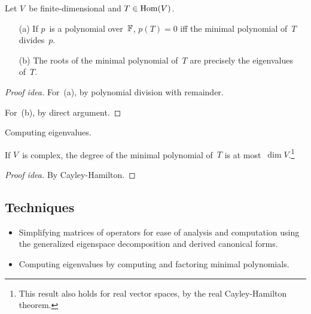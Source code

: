 \begin{thm}
Let \(V\)~be finite-dimensional and \(T\in\operatorname{Hom}(V)\).
\begin{enumerate}[itemsep=0pt]
\item[(a)] If \(p\)~is a polynomial over~\(\mathbb{F}\), \(p(T)=0\) iff the minimal polynomial of~\(T\) divides~\(p\).
\item[(b)] The roots of the minimal polynomial of~\(T\) are precisely the eigenvalues of~\(T\).
\end{enumerate}
\end{thm}
\begin{proof}[Proof idea]
For~(a), by polynomial division with remainder.

For~(b), by direct argument.
\end{proof}
\begin{app}
Computing eigenvalues.
\end{app}
\begin{cor}
If \(V\)~is complex, the degree of the minimal polynomial of~\(T\) is at most~\(\dim V\).\footnote{This result also holds for real vector spaces, by the real Cayley-Hamilton theorem.}
\end{cor}
\begin{proof}[Proof idea]
By Cayley-Hamilton.
\end{proof}

\subsection*{Techniques}
\begin{itemize}[itemsep=0pt]
\item Simplifying matrices of operators for ease of analysis and computation using the generalized eigenspace decomposition and derived canonical forms.
\item Computing eigenvalues by computing and factoring minimal polynomials.
\end{itemize}
